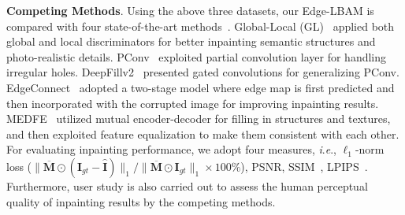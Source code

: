 \documentclass[10pt,journal,compsoc]{IEEEtran}
\newcommand{\ie}{\textit{i}.\textit{e}.}
\begin{document}
{\textbf{Competing Methods}.} Using the above three datasets, our Edge-LBAM is compared with four state-of-the-art methods~\cite{IizukaGL,partialconv2017,yu2018free,nazeri2019edgeconnect}.
%
Global-Local (GL)~\cite{IizukaGL} applied both global and local discriminators for better inpainting semantic structures and photo-realistic details.
%
PConv~\cite{partialconv2017} exploited partial convolution layer for handling irregular holes.  %
DeepFillv2~\cite{yu2018free} presented gated convolutions for generalizing PConv.
%
EdgeConnect~\cite{nazeri2019edgeconnect} adopted a two-stage model where edge map is first predicted and then incorporated with the corrupted image for improving inpainting results.
%
{MEDFE~\cite{liu2020rethinking} utilized mutual encoder-decoder for filling in structures and textures, and then exploited feature equalization to make them consistent with each other.}
%
%
%
%
%
%
%
%
For evaluating inpainting performance, we adopt four measures, \ie, $\ell_1$-norm loss ($\| \overline{\mathbf{M}} \odot (\mathbf{I}_{gt} - \hat{\mathbf{I}}) \|_1 / \|\overline{\mathbf{M}} \odot \mathbf{I}_{gt}\|_1 \times 100\%$), PSNR, SSIM~\cite{wang2004image}, LPIPS~\cite{zhang2018unreasonable}.
%
Furthermore, user study is also carried out to assess the human perceptual quality of inpainting results by the competing methods.
%



%
%
%
%
\end{document}
